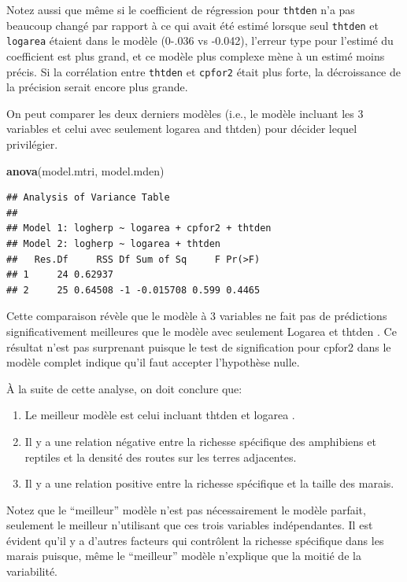 \documentclass[12pt,]{book}
\newenvironment{Shaded}{\begin{snugshade}}{\end{snugshade}}
\newcommand{\KeywordTok}[1]{\textcolor[rgb]{0.13,0.29,0.53}{\textbf{#1}}}
\newcommand{\NormalTok}[1]{#1}
\providecommand{\tightlist}{%
  \setlength{\itemsep}{0pt}\setlength{\parskip}{0pt}}
\begin{document}
Notez aussi que même si le coefficient de régression pour \texttt{thtden} n'a pas beaucoup changé par rapport à ce qui avait été estimé lorsque seul \texttt{thtden} et \texttt{logarea} étaient dans le modèle (0-.036 vs -0.042), l'erreur type pour l'estimé du coefficient est plus grand, et ce modèle plus complexe mène à un estimé moins précis. Si la corrélation entre \texttt{thtden} et \texttt{cpfor2} était plus forte, la décroissance de la précision serait encore plus grande.

On peut comparer les deux derniers modèles (i.e., le modèle incluant les 3 variables et celui avec seulement logarea and thtden) pour décider lequel privilégier.

\begin{Shaded}
\begin{Highlighting}[]
\KeywordTok{anova}\NormalTok{(model.mtri, model.mden)}
\end{Highlighting}
\end{Shaded}

\begin{verbatim}
## Analysis of Variance Table
## 
## Model 1: logherp ~ logarea + cpfor2 + thtden
## Model 2: logherp ~ logarea + thtden
##   Res.Df     RSS Df Sum of Sq     F Pr(>F)
## 1     24 0.62937                          
## 2     25 0.64508 -1 -0.015708 0.599 0.4465
\end{verbatim}

Cette comparaison révèle que le modèle à 3 variables ne fait pas de prédictions significativement meilleures que le modèle avec seulement Logarea et thtden . Ce résultat n'est pas surprenant puisque le test de signification pour cpfor2 dans le modèle complet indique qu'il faut accepter l'hypothèse nulle.

À la suite de cette analyse, on doit conclure que:

\begin{enumerate}
\def\labelenumi{\arabic{enumi}.}
\tightlist
\item
  Le meilleur modèle est celui incluant thtden et logarea .
\item
  Il y a une relation négative entre la richesse spécifique des amphibiens et reptiles et la densité des routes sur les terres adjacentes.
\item
  Il y a une relation positive entre la richesse spécifique et la taille des marais.
\end{enumerate}

Notez que le ``meilleur'' modèle n'est pas nécessairement le modèle parfait, seulement le meilleur n'utilisant que ces trois variables indépendantes. Il est évident qu'il y a d'autres facteurs qui contrôlent la richesse spécifique dans les marais puisque, même le ``meilleur'' modèle n'explique que la moitié de la variabilité.
\end{document}
